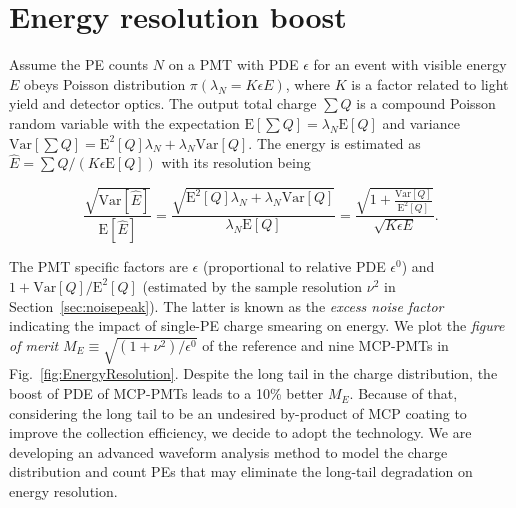 \section{Energy resolution boost}
\label{Result}
Assume the PE counts $N$ on a PMT with PDE $\epsilon$ for an event with visible energy $E$ obeys Poisson distribution $\pi(\lambda_N=K\epsilon E)$, where $K$ is a factor related to light yield and detector optics. The output total charge $\sum{Q}$ is a compound Poisson random variable with the expectation $\mathrm{E}[\sum{Q}]=\lambda_N\mathrm{E}[Q]$ and variance $\mathrm{Var}[\sum{Q}]=\mathrm{E}^2[Q]\lambda_N+\lambda_N\mathrm{Var}[Q]$. The energy is estimated as $\hat{E}=\sum{Q}/(K\epsilon\mathrm{E}[Q])$ with its resolution being

\begin{equation}
    \frac{\sqrt{\mathrm{Var}[\hat{E}]}}{\mathrm{E}[\hat{E}]}=\frac{\sqrt{\mathrm{E}^2[Q]\lambda_N+\lambda_N\mathrm{Var}[Q]}}{\lambda_N\mathrm{E}[Q]}=\frac{\sqrt{1+\frac{\mathrm{Var}[Q]}{\mathrm{E}^2[Q]}}}{\sqrt{K\epsilon E}}.
\end{equation}

The PMT specific factors are $\epsilon$ (proportional to relative PDE $\epsilon^0$) and \(1 + \mathrm{Var}[Q]/ \mathrm{E}^2[Q]\) (estimated by the sample resolution $\nu^2$ in Section~\ref{sec:noisepeak}).  The latter is known as the \emph{excess noise factor}~\cite{JUNOMassTesting,ENF,ENFAuger} indicating the impact of single-PE charge smearing on energy.  We plot the \emph{figure of merit} $M_{E}\equiv\sqrt{({1+\nu^2})/{\epsilon^0}}$ of the reference and nine MCP-PMTs in Fig.~\ref{fig:EnergyResolution}. Despite the long tail in the charge distribution, the boost of PDE of MCP-PMTs leads to a 10\% better $M_{E}$.  Because of that, considering the long tail to be an undesired by-product of MCP coating to improve the collection efficiency, we decide to adopt the technology.  We are developing an advanced waveform analysis method to model the charge distribution and count PEs that may eliminate the long-tail degradation on energy resolution.

